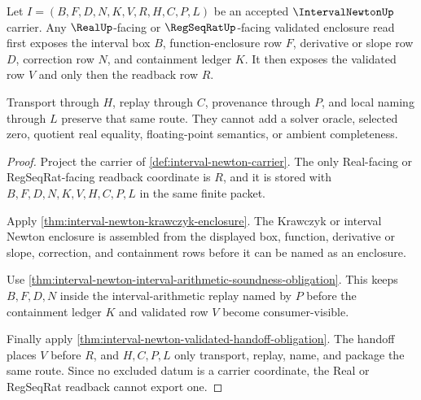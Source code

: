 \begin{theorem}
\label{thm:interval-newton-real-readback-scope}
Let $I=(B,F,D,N,K,V,R,H,C,P,L)$ be an accepted $\IntervalNewtonUp$ carrier. Any $\RealUp$-facing or $\RegSeqRatUp$-facing validated enclosure read first exposes the interval box $B$, function-enclosure row $F$, derivative or slope row $D$, correction row $N$, and containment ledger $K$. It then exposes the validated row $V$ and only then the readback row $R$.

Transport through $H$, replay through $C$, provenance through $P$, and local naming through $L$ preserve that same route. They cannot add a solver oracle, selected zero, quotient real equality, floating-point semantics, or ambient completeness.
\end{theorem}
\begin{proof}
Project the carrier of \autoref{def:interval-newton-carrier}. The only Real-facing or RegSeqRat-facing readback coordinate is $R$, and it is stored with $B,F,D,N,K,V,H,C,P,L$ in the same finite packet.

Apply \autoref{thm:interval-newton-krawczyk-enclosure}. The Krawczyk or interval Newton enclosure is assembled from the displayed box, function, derivative or slope, correction, and containment rows before it can be named as an enclosure.

Use \autoref{thm:interval-newton-interval-arithmetic-soundness-obligation}. This keeps $B,F,D,N$ inside the interval-arithmetic replay named by $P$ before the containment ledger $K$ and validated row $V$ become consumer-visible.

Finally apply \autoref{thm:interval-newton-validated-handoff-obligation}. The handoff places $V$ before $R$, and $H,C,P,L$ only transport, replay, name, and package the same route. Since no excluded datum is a carrier coordinate, the Real or RegSeqRat readback cannot export one.
\end{proof}

